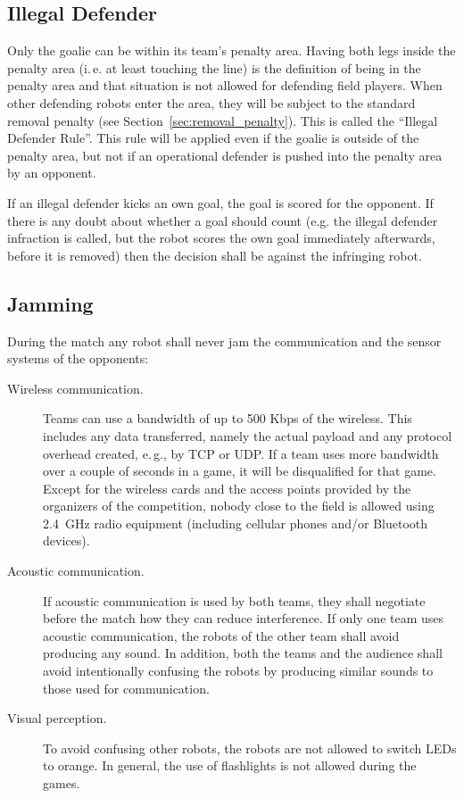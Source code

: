 \documentclass[12pt]{article}
\newcommand{\ie}{\mbox{i.\,e.}\xspace}
\newcommand{\eg}{\mbox{e.\,g.}\xspace}
\begin{document}
\subsection{Illegal Defender}
\label{sec:illegal_defender}

Only the goalie can be within its team's penalty area. Having both legs inside the penalty area (\ie at least touching the line) is the definition of being in the penalty area and that situation is not allowed for defending field players. When other defending robots enter the area, they will be subject to the standard removal penalty (see Section~\ref{sec:removal_penalty}). This is called the ``Illegal Defender Rule''. This rule will be applied even if the goalie is outside of the penalty area, but not if an operational defender is pushed into the penalty area by an opponent.

If an illegal defender kicks an own goal, the goal is scored for the opponent. If there is any doubt about whether a goal should count (e.g. the illegal defender infraction is called, but the robot scores the own goal immediately afterwards, before it is removed) then the decision shall be against the infringing robot.

\subsection{Jamming}

During the match any robot shall never jam the communication and the sensor systems of the opponents:

\begin{description}

\item[Wireless communication.] Teams can use a bandwidth of up to 500 Kbps of the wireless. This includes any data transferred, namely the actual payload and any protocol overhead created, \eg, by TCP or UDP. If a team uses more bandwidth over a couple of seconds in a game, it will be disqualified for that game. Except for the wireless cards and the access points provided by the organizers of the competition, nobody close to the field is allowed using 2.4~GHz radio equipment (including cellular phones and/or Bluetooth devices).

\item[Acoustic communication.] If acoustic communication is used by both teams, they shall negotiate before the match how they can reduce interference. If only one team uses acoustic communication, the robots of the other team shall avoid producing any sound. In addition, both the teams and the audience shall avoid intentionally confusing the robots by producing similar sounds to those used for communication.

\item[Visual perception.] To avoid confusing other robots, the robots are not allowed to switch LEDs to orange. In general, the use of flashlights is not allowed during the games.

\end{description}
\end{document}
